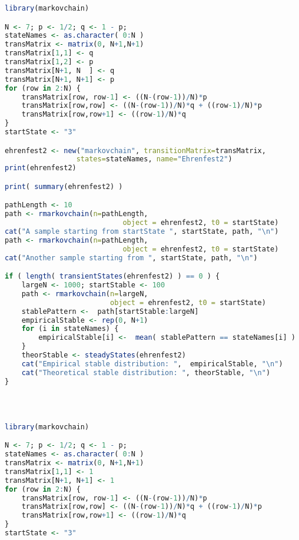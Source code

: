 \begin{description}

\begin{lstlisting}[language=R]
library(markovchain)

N <- 7; p <- 1/2; q <- 1 - p;
stateNames <- as.character( 0:N )
transMatrix <- matrix(0, N+1,N+1)
transMatrix[1,1] <- q
transMatrix[1,2] <- p
transMatrix[N+1, N  ] <- q
transMatrix[N+1, N+1] <- p
for (row in 2:N) {
    transMatrix[row, row-1] <- ((N-(row-1))/N)*p
    transMatrix[row,row] <- ((N-(row-1))/N)*q + ((row-1)/N)*p
    transMatrix[row,row+1] <- ((row-1)/N)*q
}
startState <- "3"

ehrenfest2 <- new("markovchain", transitionMatrix=transMatrix,
                 states=stateNames, name="Ehrenfest2")
print(ehrenfest2)

print( summary(ehrenfest2) )

pathLength <- 10 
path <- rmarkovchain(n=pathLength,
                            object = ehrenfest2, t0 = startState)
cat("A sample starting from startState ", startState, path, "\n")
path <- rmarkovchain(n=pathLength,
                            object = ehrenfest2, t0 = startState)
cat("Another sample starting from ", startState, path, "\n")

if ( length( transientStates(ehrenfest2) ) == 0 ) {
    largeN <- 1000; startStable <- 100
    path <- rmarkovchain(n=largeN,
                         object = ehrenfest2, t0 = startState)
    stablePattern <-  path[startStable:largeN]
    empiricalStable <- rep(0, N+1)
    for (i in stateNames) { 
        empiricalStable[i] <-  mean( stablePattern == stateNames[i] )
    }
    theorStable <- steadyStates(ehrenfest2)
    cat("Empirical stable distribution: ",  empiricalStable, "\n")
    cat("Theoretical stable distribution: ", theorStable, "\n")
}


  
\end{lstlisting}


\begin{lstlisting}[language=R]
library(markovchain)

N <- 7; p <- 1/2; q <- 1 - p;
stateNames <- as.character( 0:N )
transMatrix <- matrix(0, N+1,N+1)
transMatrix[1,1] <- 1
transMatrix[N+1, N+1] <- 1
for (row in 2:N) {
    transMatrix[row, row-1] <- ((N-(row-1))/N)*p
    transMatrix[row,row] <- ((N-(row-1))/N)*q + ((row-1)/N)*p
    transMatrix[row,row+1] <- ((row-1)/N)*q
}
startState <- "3"


\end{lstlisting}
\end{description}
